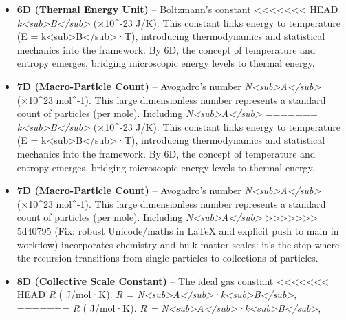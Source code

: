 \documentclass[]{article}
\begin{document}
{\begin{itemize}
  scale at which classical physics gives way to quantum behavior.
\item
  \textbf{6D (Thermal Energy Unit)} -- Boltzmann's constant
<<<<<<< HEAD
  \emph{k\textless sub\textgreater B\textless/sub\textgreater{}} (×10\^{}-23 J/K)\hspace{0pt}. This constant links energy to
  temperature (E =
  k\textless sub\textgreater B\textless/sub\textgreater·T), introducing
  thermodynamics and statistical mechanics into the framework. By 6D,
  the concept of temperature and entropy emerges, bridging microscopic
  energy levels to thermal energy.
\item
  \textbf{7D (Macro-Particle Count)} -- Avogadro's number
  \emph{N\textless sub\textgreater A\textless/sub\textgreater{}} (×10\^{}23 mol\^{}-1)\hspace{0pt}. This large dimensionless number
  represents a standard count of particles (per mole). Including
  \emph{N\textless sub\textgreater A\textless/sub\textgreater{}}
=======
  \emph{k\textless{}sub\textgreater{}B\textless{}/sub\textgreater{}} (×10\^{}-23 J/K)​. This constant links energy to temperature (E
  = k\textless{}sub\textgreater{}B\textless{}/sub\textgreater{}·T),
  introducing thermodynamics and statistical mechanics into the
  framework. By 6D, the concept of temperature and entropy emerges,
  bridging microscopic energy levels to thermal energy.
\item
  \textbf{7D (Macro-Particle Count)} -- Avogadro's number
  \emph{N\textless{}sub\textgreater{}A\textless{}/sub\textgreater{}} (×10\^{}23 mol\^{}-1)​. This large dimensionless number represents
  a standard count of particles (per mole). Including
  \emph{N\textless{}sub\textgreater{}A\textless{}/sub\textgreater{}}
>>>>>>> 5d40795 (Fix: robust Unicode/maths in LaTeX and explicit push to main in workflow)
  incorporates chemistry and bulk matter scales: it's the step where the
  recursion transitions from single particles to collections of
  particles.
\item
  \textbf{8D (Collective Scale Constant)} -- The ideal gas constant
<<<<<<< HEAD
  \emph{R} ( J/mol·K)\hspace{0pt}. \emph{R =
  N\textless sub\textgreater A\textless/sub\textgreater·k\textless sub\textgreater B\textless/sub\textgreater{}},
=======
  \emph{R} ( J/mol·K)​. \emph{R =
  N\textless{}sub\textgreater{}A\textless{}/sub\textgreater{}·k\textless{}sub\textgreater{}B\textless{}/sub\textgreater{}},

\end{itemize}}
\end{document}
